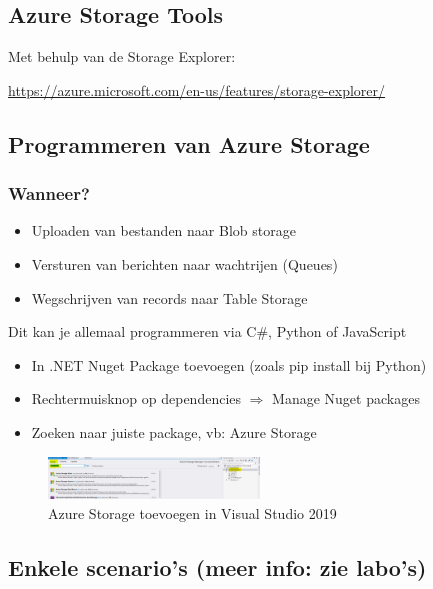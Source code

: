 \documentclass{article}
\begin{document}
\subsection{Azure Storage Tools}

Met behulp van de Storage Explorer: 

\url{https://azure.microsoft.com/en-us/features/storage-explorer/}

\subsection{Programmeren van Azure Storage}

\subsubsection{Wanneer?}

\begin{itemize}
    \item Uploaden van bestanden naar Blob storage
    \item Versturen van berichten naar wachtrijen (Queues)
    \item Wegschrijven van records naar Table Storage
\end{itemize}

Dit kan je allemaal programmeren via C\#, Python of JavaScript

\begin{itemize}
    \item In .NET Nuget Package toevoegen (zoals pip install bij Python)
    \item Rechtermuisknop op dependencies $\Rightarrow$ Manage Nuget packages
    \item Zoeken naar juiste package, vb: Azure Storage
\end{itemize}

\begin{figure}[H]
    \centering
    \includegraphics[width=0.5\textwidth]{azure-storage-visual-studio.png}
    \caption{Azure Storage toevoegen in Visual Studio 2019}
\end{figure}

\subsection{Enkele scenario's (meer info: zie labo's)}
\end{document}
